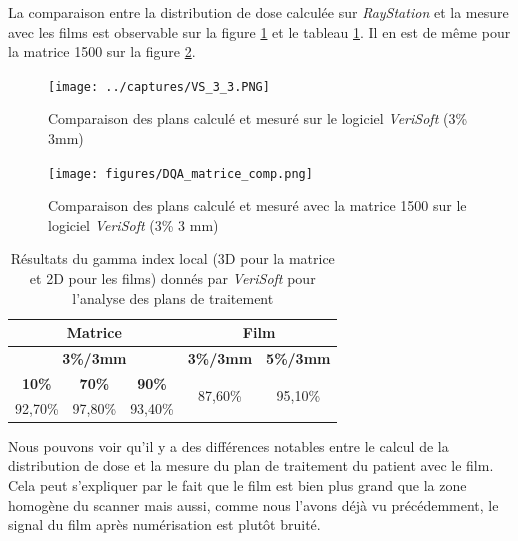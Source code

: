 \documentclass{book}
\begin{document}
La comparaison entre la distribution de dose calculée sur \textit{RayStation} et la mesure avec les films est observable sur la figure \ref*{fig_dose_map_VS} et le tableau \ref*{table_gamma_index}. Il en est de même pour la matrice 1500 sur la figure \ref*{fig_dose_map_matrice}.

\begin{figure}[h]
  \centering
  \texttt{[image: ../captures/VS\_3\_3.PNG]}
  \caption{Comparaison des plans calculé et mesuré sur le logiciel \textit{VeriSoft} (3\% 3mm)}
  \label{fig_dose_map_VS}
\end{figure}

\begin{figure}[h]
  \centering
  \texttt{[image: figures/DQA\_matrice\_comp.png]}
  \caption{Comparaison des plans calculé et mesuré avec la matrice 1500 sur le logiciel \textit{VeriSoft} (3\% 3 mm)}
  \label{fig_dose_map_matrice}
\end{figure}

\begin{table}[h]
  \centering
  \begin{tabular}{|ccc|cc|}
  \hline
  \multicolumn{3}{|c|}{\textbf{Matrice}}                                 & \multicolumn{2}{c|}{\textbf{Film}}                       \\ \hline
  \multicolumn{3}{|c|}{\textbf{3\%/3mm}}                                 & \multicolumn{1}{c|}{\textbf{3\%/3mm}} & \textbf{5\%/3mm} \\ \hline
  \multicolumn{1}{|c|}{\textbf{10\%}} & \multicolumn{1}{c|}{\textbf{70\%}} & \textbf{90\%} & \multicolumn{1}{c|}{\multirow{2}{*}{87,60\%}} & \multirow{2}{*}{95,10\%} \\ \cline{1-3}
  \multicolumn{1}{|c|}{92,70\%} & \multicolumn{1}{c|}{97,80\%} & 93,40\% & \multicolumn{1}{c|}{}                 &                  \\ \hline
  \end{tabular}
  \caption{Résultats du gamma index local (3D pour la matrice et 2D pour les films) donnés par \textit{VeriSoft} pour l'analyse des plans de traitement}
  \label{table_gamma_index}
  \end{table}

Nous pouvons voir qu'il y a des différences notables entre le calcul de la distribution de dose et la mesure du plan de traitement du patient avec le film. Cela peut s'expliquer par le fait que le film est bien plus grand que la zone homogène du scanner mais aussi, comme nous l'avons déjà vu précédemment, le signal du film après numérisation est plutôt bruité.
\end{document}
